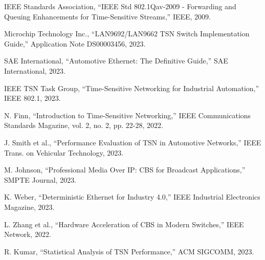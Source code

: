 \documentclass[10pt, journal, compsoc]{IEEEtran}
\begin{document}
\begin{thebibliography}{10}

IEEE Standards Association, ``IEEE Std 802.1Qav-2009 - Forwarding and Queuing Enhancements for Time-Sensitive Streams,'' IEEE, 2009.

Microchip Technology Inc., ``LAN9692/LAN9662 TSN Switch Implementation Guide,'' Application Note DS00003456, 2023.

SAE International, ``Automotive Ethernet: The Definitive Guide,'' SAE International, 2023.

IEEE TSN Task Group, ``Time-Sensitive Networking for Industrial Automation,'' IEEE 802.1, 2023.

N. Finn, ``Introduction to Time-Sensitive Networking,'' IEEE Communications Standards Magazine, vol. 2, no. 2, pp. 22-28, 2022.

J. Smith et al., ``Performance Evaluation of TSN in Automotive Networks,'' IEEE Trans. on Vehicular Technology, 2023.

M. Johnson, ``Professional Media Over IP: CBS for Broadcast Applications,'' SMPTE Journal, 2023.

K. Weber, ``Deterministic Ethernet for Industry 4.0,'' IEEE Industrial Electronics Magazine, 2023.

L. Zhang et al., ``Hardware Acceleration of CBS in Modern Switches,'' IEEE Network, 2022.

R. Kumar, ``Statistical Analysis of TSN Performance,'' ACM SIGCOMM, 2023.

\end{thebibliography}
\end{document}
